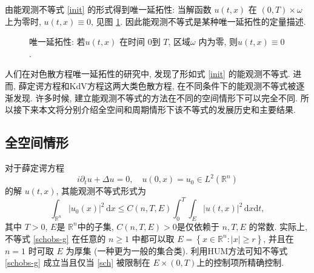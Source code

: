\documentclass[master]{cugthesis}
\newcommand\R{\ensuremath{\mathbb{R}}}
\renewcommand\d{\ensuremath{\,\mathrm{d}}}
\begin{document}
    
    由能观测不等式 \eqref{init} 的形式得到唯一延拓性: 当解函数 $u(t,x)$ 在 $(0,T)\times \omega$ 上为零时, $u(t,x)\equiv 0$, 见图 \ref{fig2}. 因此能观测不等式是某种唯一延拓性的定量描述.
    \begin{figure}[ht]
    \centering
    \caption{唯一延拓性: 若$u(t,x)$ 在时间 $0$到 $T$, 区域$\omega$ 内为零, 则$u(t,x)\equiv 0$.}
    \label{fig2}
  \end{figure}
    
    人们在对色散方程唯一延拓性的研究中, 发现了形如式 \eqref{init} 的能观测不等式. 进而, 薛定谔方程和KdV方程这两大类色散方程, 在不同条件下的能观测不等式被逐渐发现. 许多时候, 建立能观测不等式的方法在不同的空间情形下可以完全不同. 所以接下来本文将分别介绍全空间和周期情形下该不等式的发展历史和主要结果.
    
    \subsection{全空间情形}
    对于薛定谔方程
    \begin{equation}
        i\partial_t u +\Delta u =0,\quad u(0,x)=u_0\in L^2(\R^n)\label{sch}
    \end{equation}
    的解 $u(t,x)$, 其能观测不等式形式为
    \begin{equation}
        \int_{\R^n}|u_0(x)|^2\d x\le C(n,T,E)\int_0^T\int_E|u(t,x)|^2\d x\mathrm{d}t,\label{schobs-g}
    \end{equation}
    其中 $T>0$, $E$是 $\R^n$中的子集, $C(n,T,E)>0$是仅依赖于 $n,T,E$ 的常数. 实际上, 不等式 \eqref{schobs-g} 在任意的 $n\ge 1$ 中都可以取 $E=\left\lbrace x\in \R^n: |x|\ge r\right\rbrace$\cite{Rosier2009ExactBC}, 并且在 $n=1$ 时可取 $E$ 为厚集\cite{Huang2020ObservableSP} (一种更为一般的集合类). 利用HUM方法\cite{Lions1988ControlabiliteEP}可知不等式 \eqref{schobs-g} 成立当且仅当 \eqref{sch} 被限制在 $E\times (0, T)$上的控制项所精确控制.
    
\end{document}
